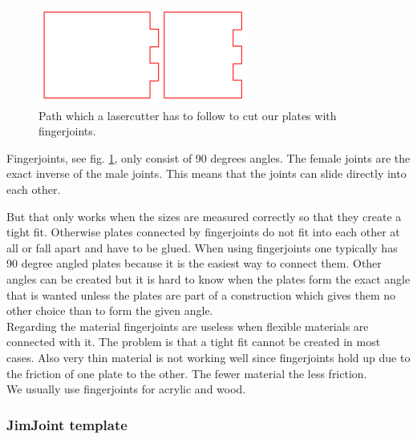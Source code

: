 \documentclass[../ClassicThesis.tex]{subfiles}
\begin{document}
\begin{figure}[!ht]
\centering
\includegraphics[width=.5\columnwidth]{Images/fingerjoints.png}
\caption{Path which a lasercutter has to follow to cut our plates with fingerjoints.}
\label{fig:fingerjoints}
\end{figure}


Fingerjoints, see fig. \ref{fig:fingerjoints}, only consist of 90 degrees angles. The female joints are the exact inverse of the male joints. This means that the joints can slide directly into each other. 

But that only works when the sizes are measured correctly so that they create a tight fit. Otherwise plates connected by fingerjoints do not fit into each other at all or fall apart and have to be glued. 
When using fingerjoints one typically has 90 degree angled plates because it is the easiest way to connect them. Other angles can be created but it is hard to know when the plates form the exact angle that is wanted unless the plates are part of a construction which gives them no other choice than to form the given angle.\\
Regarding the material fingerjoints are useless when flexible materials are connected with it. The problem is that a tight fit cannot be created in most cases. Also very thin material is not working well since fingerjoints hold up due to the friction of one plate to the other. The fewer material the less friction.\\
We usually use fingerjoints for acrylic and wood.


\subsubsection{JimJoint template}
\end{document}
